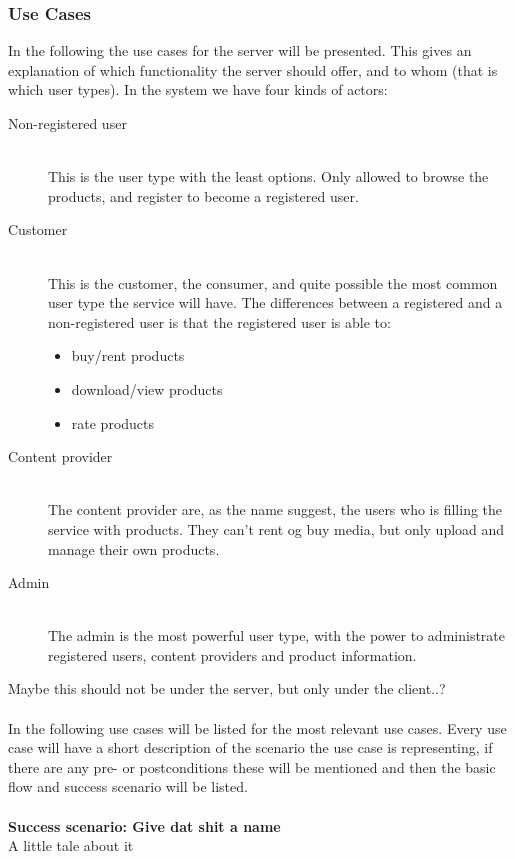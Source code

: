 \subsubsection{Use Cases}
In the following the use cases for the server will be presented. This gives an explanation of which functionality the server should offer, and to whom (that is which user types).
\label{s_actor-goal-list}
In the system we have four kinds of actors:
\begin{description}
	\item [Non-registered user] \hfill \\
		This is the user type with the least options. Only allowed to browse the products, and register to become a registered user.
	\item [Customer]  \hfill \\
		This is the customer, the consumer, and quite possible the most common user type the service will have. The differences between a registered and a non-registered user is that the registered user is able to:
		\begin{itemize}
			\item buy/rent products
			\item download/view products
			\item rate products
		\end{itemize}
	\item [Content provider] \hfill \\
		The content provider are, as the name suggest, the users who is filling the service with products. They can't rent og buy media, but only upload and manage their own products.
	\item [Admin] \hfill \\
		The admin is the most powerful user type, with the power to administrate registered users, content providers and product information.
\end{description}

Maybe this should not be under the server, but only under the client..?\\\\
In the following use cases will be listed for the most relevant use cases. Every use case will have a short description of the scenario the use case is representing, if there are any pre- or postconditions these will be mentioned and then the basic flow and success scenario will be listed.
\\\\
\textbf{Success scenario: Give dat shit a name} \\
A little tale about it

